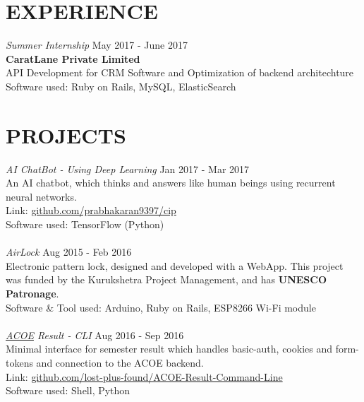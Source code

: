 \documentclass[margin, 10pt]{res} %
\begin{document}
\begin{resume}
\section{EXPERIENCE}
{\sl Summer Internship } \hfill May 2017 - June 2017 \\
{\bf CaratLane Private Limited} \\
API Development for CRM Software and Optimization of backend architechture \\
Software used: Ruby on Rails, MySQL, ElasticSearch
\section{PROJECTS}
{\sl AI ChatBot - Using Deep Learning} \hfill Jan 2017 - Mar 2017 \\
An AI chatbot, which thinks and answers like human beings using recurrent neural networks. \\
Link: \href{https://github.com/prabhakaran9397/cip}{github.com/prabhakaran9397/cip} \\
Software used: TensorFlow (Python) \\
\\
{\sl AirLock} \hfill Aug 2015 - Feb 2016 \\
Electronic pattern lock, designed and developed with a WebApp. This project was funded by the Kurukshetra Project Management, and has \textbf{UNESCO Patronage}.\\
Software \& Tool used: Arduino, Ruby on Rails, ESP8266 Wi-Fi module \\
\\
{\sl \href{acoe.annauniv.edu}{ACOE} Result - CLI} \hfill Aug 2016 - Sep 2016 \\
Minimal interface for semester result which handles basic-auth, cookies and form-tokens and connection to the ACOE backend.\\
Link: \href{https://github.com/lost-plus-found/ACOE-Result-Command-Line}{github.com/lost-plus-found/ACOE-Result-Command-Line} \\
Software used: Shell, Python

\end{resume}
\end{document}
